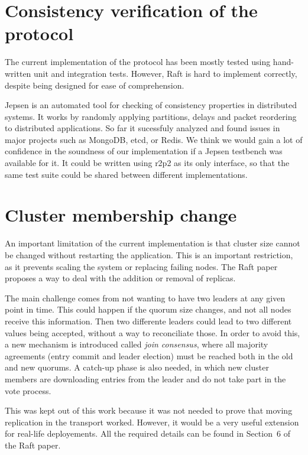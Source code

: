 \section{Consistency verification of the protocol}

The current implementation of the protocol has been mostly tested using hand-written unit and integration tests.
However, Raft is hard to implement correctly, despite being designed for ease of comprehension.


Jepsen\cite{jepsen} is an automated tool for checking of consistency properties in distributed systems.
It works by randomly applying partitions, delays and packet reordering to distributed applications.
So far it sucessfuly analyzed and found issues in major projects such as MongoDB, etcd, or Redis.
We think we would gain a lot of confidence in the soundness of our implementation if a Jepsen testbench was available for it.
It could be written using \gls{r2p2} as its only interface, so that the same test suite could be shared between different implementations.

\section{Cluster membership change}

An important limitation of the current implementation is that cluster size cannot be changed without restarting the application.
This is an important restriction, as it prevents scaling the system or replacing failing nodes.
The Raft paper\cite{raft} proposes a way to deal with the addition or removal of replicas.

The main challenge comes from not wanting to have two leaders at any given point in time.
This could happen if the quorum size changes, and not all nodes receive this information.
Then two differente leaders could lead to two different values being accepted, without a way to reconciliate those.
In order to avoid this, a new mechanism is introduced called \emph{join consensus}, where all majority agreements (entry commit and leader election) must be reached both in the old and new quorums.
A catch-up phase is also needed, in which new cluster members are downloading entries from the leader and do not take part in the vote process.

This was kept out of this work because it was not needed to prove that moving replication in the transport worked.
However, it would be a very useful extension for real-life deployements.
All the required details can be found in Section~6 of the Raft paper\cite[p.~10]{raft}.


